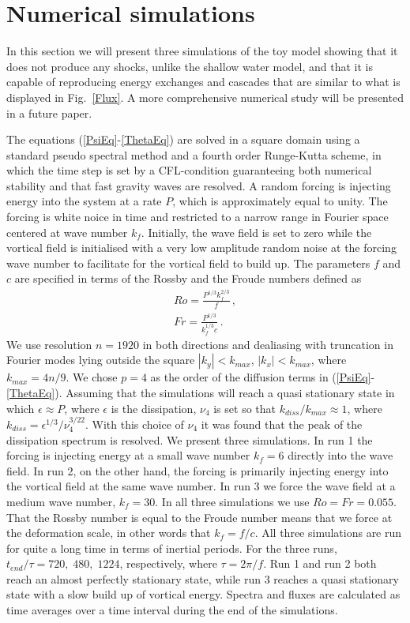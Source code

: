 \section{Numerical simulations} 
In this section we will present { three}  simulations of the toy model showing that it does not produce any shocks, unlike the shallow water model, and that it is capable of reproducing energy exchanges and cascades that are similar to what is displayed in Fig.~\ref{Flux}.  A more comprehensive numerical study will be presented in a future paper. 

The equations (\ref{PsiEq}-\ref{ThetaEq}) are solved in a square domain  using a standard pseudo spectral method and a fourth order Runge-Kutta scheme, in which the time step is set by a CFL-condition guaranteeing both numerical stability and that fast gravity waves are resolved.   A random forcing is  injecting energy into the system at a rate $ P $, which is approximately equal to unity. 
The forcing is white noice in time and restricted to a narrow range in Fourier space centered at wave number $ k_f $. Initially, the wave field is set to zero while the vortical field is initialised with a very low amplitude random noise at the forcing wave number to facilitate for the vortical field to build up.
The parameters $ f $ and $ c $ are specified in terms of the Rossby and the Froude numbers defined as
\begin{eqnarray}
Ro = \frac{P^{1/3} k_f^{2/3}}{f} \, , \\
Fr = \frac{P^{1/3}}{k_f^{1/3} c}  \, .
\end{eqnarray} 
We use resolution $ n = 1920 $ in both directions and dealiasing with truncation in Fourier modes  lying outside the square $ | k_y | <  k_{max} $,  $ | k_x | < k_{max} $,  where $ k_{max} = 4n/9 $.  
We chose  $ p = 4 $ as the order of the diffusion terms in (\ref{PsiEq}-\ref{ThetaEq}).  { Assuming that the simulations will reach a quasi stationary state in which $ \epsilon \approx P $, where $ \epsilon $ is the dissipation, $ \nu_4 $  is set so that $ k_{diss}/k_{max} \approx 1$, where $ k_{diss} = \epsilon^{1/3}/\nu_4^{3/22} $. With this choice of $ \nu_4 $ it was found that the peak of the dissipation spectrum is resolved. We present three simulations. In run 1 the forcing is injecting energy at a small wave number $ k_f = 6 $ directly into the wave field. In run 2, on the other hand, the forcing is primarily injecting energy into the vortical field at the same wave number. In run 3 we force the wave field at a medium wave number, $ k_f = 30 $.
In all three simulations we use $ Ro= Fr = 0.055 $. } That 
the Rossby number is equal to the Froude number means that we force at the deformation scale,  in other words that  $ k_f  = f/c $.  { All  three simulations are run for quite a long time in terms of inertial periods.  
For the three runs, $ t_{end}/\tau = 720, \; 480, \;  1224 $, respectively,  where $ \tau = 2 \pi /f  $. Run 1 and run 2 both reach an almost perfectly stationary state, while run 3 reaches a quasi stationary state with a slow build up of vortical energy. Spectra and fluxes are calculated as time averages over a time interval during the end of the simulations. }





